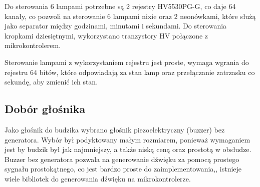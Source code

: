 \documentclass{article}
\begin{document}
Do sterowania 6 lampami potrzebne są 2 rejestry HV5530PG-G, co daje 64 kanały, co pozwoli na sterowanie 6 lampami nixie oraz 2 neonówkami, które
służą jako separator między godzinami, minutami i sekundami. Do sterowania kropkami dziesiętnymi, wykorzystano tranzystory HV połączone z mikrokontrolerem.

Sterowanie lampami z wykorzystaniem rejestru jest proste, wymaga wgrania do rejestru 64 bitów, które odpowiadają za stan lamp oraz przełączanie
zatrzasku co sekundę, aby zmienić ich stan.

\subsection{Dobór głośnika}
Jako głośnik do budzika wybrano głośnik piezoelektryczny (buzzer) bez generatora. Wybór był podyktowany 
małym rozmiarem, ponieważ wymaganiem jest by budzik był jak najmniejszy, a także niską ceną oraz prostotą w obsłudze.
Buzzer bez generatora pozwala na generowanie dźwięku za pomocą prostego sygnału prostokątnego,
co jest bardzo proste do zaimplementowania,, istnieje wiele bibliotek do generowania dźwięku na mikrokontrolerze.
\end{document}
